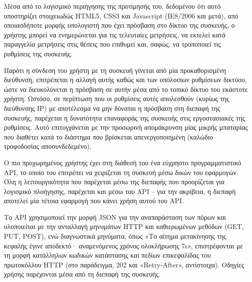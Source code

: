 Μέσα από το λογισμικό περιήγησης της προτίμησής του, δεδομένου ότι αυτό
υποστηρίζει στοιχειωδώς HTML5, CSS3 και Javascript (ΙΕ8/2006 και μετά), από
οποιασδήποτε μορφής υπολογιστή που έχει πρόσβαση στο δίκτυο της συσκευής, ο
χρήστης μπορεί να ενημερώνεται για τις τελευταίες μετρήσεις, να εκτελεί κατά
παραγγελία μετρήσεις στις θέσεις που επιθυμεί και, σαφώς, να τροποποιεί τις
ρυθμίσεις της συσκευής.

Παρότι η σύνδεση του χρήστη με τη συσκευή γίνεται από μία προκαθορισμένη
διεύθυνση, επιτρέπεται η αλλαγή αυτής καθώς και των υπόλοιπων ρυθμίσεων δικτύου,
ώστε να διευκολύνεται η πρόσβαση σε αυτήν μέσα από το τοπικό δίκτυο του εκάστοτε
χρήστη. Ωστόσο, σε περίπτωση που οι ρυθμίσεις αυτές απολεσθούν (κυρίως της
διεύθυνσης IP) με αποτέλεσμα να μην δύναται η πρόσβαση στη διεπαφή της συσκευής,
παρέχεται η δυνατότητα επαναφοράς της συσκευής στις εργοστασιακές της ρυθμίσεις.
Αυτό επιτυγχάνεται με την προσωρινή απομάκρυνση μίας μικρής 
μπαταρίας που διαθέτει κατά το διάστημα που βρίσκεται απενεργοποιημένη (καλώδιο
τροφοδοσίας αποσυνδεδεμένο).

Ο πιο προχωρημένος χρήστης έχει στη διάθεσή του ένα εύχρηστο προγραμματιστικό
API, το οποίο του επιτρέπει να χειρίζεται τη συσκευή μέσω δικών του εφαρμογών.
Όλη η λειτουργικότητα που παρέχεται μέσω της διεπαφής που προορίζεται για
λογισμικό πλοήγησης, παρέχεται και μέσω του API -- για την ακρίβεια, η διεπαφή
αποτελεί μία τέτοια εφαρμογή που κάνει χρήση αυτού του API.

Το API χρησιμοποιεί την μορφή JSON για την αναπαράσταση των πόρων και
υλοποιείται με την ανταλλαγή μηνυμάτων HTTP και καθιερωμένων μεθόδων (GET, PUT,
POST), ενώ διαγνωστικά μηνύματα, όπως «Το αίτημα μετακίνησης της κεφαλής έγινε
αποδεκτό· αναμενόμενος χρόνος ολοκλήρωσης 7s», επιστρέφονται με τη μορφή
κατάλληλων κωδικών κατάστασης και πεδίων επικεφαλίδας του πρωτοκόλλου HTTP (στο
παράδειγμα, 202 και «Retry-After», αντίστοιχα). Οδηγίες χρήσης παρέχονται μέσα
από τη διεπαφή της συσκευής.
